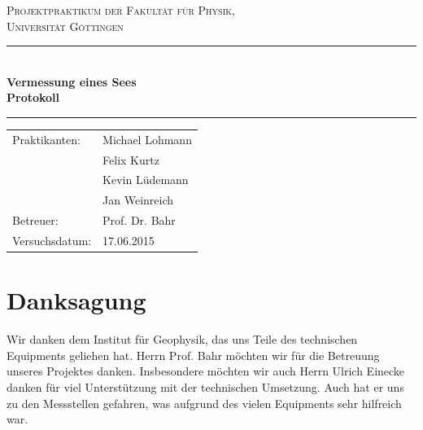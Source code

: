 \documentclass[12pt,a4paper,titlepage,headinclude,bibtotoc]{scrartcl}
\numberwithin{equation}{subsection}
\newenvironment{bottom}{\par\vspace*{\fill}}{\clearpage}
\begin{document}
\begin{titlepage}
\centering
\textsc{\Large Projektpraktikum der Fakultät für
  Physik,\\[1ex] Universität Göttingen}

\vspace*{2cm}

\rule{\textwidth}{1pt}\\[0.5cm]
{\huge \bfseries
  Vermessung eines Sees \\[1ex]
  Protokoll}\\[0.5cm]
\rule{\textwidth}{1pt}

\vspace*{2cm}

\begin{Large}
\begin{tabular}{ll}
Praktikanten: &  Michael Lohmann\\
 &  Felix Kurtz\\
 &  Kevin Lüdemann\\
 &  Jan Weinreich\\
 Betreuer: & Prof. Dr. Bahr\\
 Versuchsdatum: & 17.06.2015\\
\end{tabular}
\end{Large}

\vspace*{3.8cm}

\begin{Large}
\end{Large}

\end{titlepage}
\thispagestyle{empty}
\tableofcontents
\thispagestyle{empty}
\begin{bottom}
\section*{Danksagung}
Wir danken dem Institut für Geophysik, das uns Teile des technischen Equipments geliehen hat.
Herrn Prof. Bahr möchten wir für die Betreuung unseres Projektes danken.
Insbesondere möchten wir auch Herrn Ulrich Einecke danken für viel Unterstützung mit der technischen Umsetzung.
Auch hat er uns zu den Messstellen gefahren, was aufgrund des vielen Equipments sehr hilfreich war.
\end{bottom}
\newpage
\end{document}
